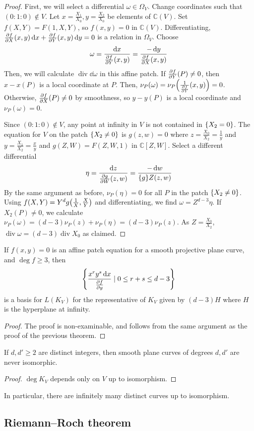\begin{proof}
    First, we will select a differential \( \omega \in \Omega_V \).
    Change coordinates such that \( (0 : 1 : 0) \not\in V \).
    Let \( x = \frac{X_1}{X_0}, y = \frac{X_2}{X_0} \) be elements of \( \mathbb C(V) \).
    Set \( f(X,Y) = F(1,X,Y) \), so \( f(x,y) = 0 \) in \( \mathbb C(V) \).
    Differentiating, \( \pdv{f}{X}\qty(x,y) \dd{x} + \pdv{f}{Y}\qty(x,y) \dd{y} = 0 \) is a relation in \( \Omega_V \).
    Choose
    \[ \omega = \frac{\dd{x}}{\pdv{f}{Y}\qty(x,y)} = \frac{-\dd{y}}{\pdv{f}{X}\qty(x,y)} \]
    Then, we will calculate \( \operatorname{div}\dd{\omega} \) in this affine patch.
    If \( \pdv{f}{Y}\qty(P) \neq 0 \), then \( x - x(P) \) is a local coordinate at \( P \).
    Then, \( \nu_P(\omega) = \nu_P\qty(\frac{1}{\pdv{f}{Y}}\qty(x,y)) = 0 \).
    Otherwise, \( \pdv{f}{X}\qty(P) \neq 0 \) by smoothness, so \( y - y(P) \) is a local coordinate and \( \nu_P(\omega) = 0 \).

    Since \( (0 : 1 : 0) \not\in V \), any point at infinity in \( V \) is not contained in \( \qty{X_2 = 0} \).
    The equation for \( V \) on the patch \( \qty{X_2 \neq 0} \) is \( g(z,w) = 0 \) where \( z = \frac{X_0}{X_2} = \frac{1}{y} \) and \( y = \frac{X_1}{X_2} = \frac{x}{y} \) and \( g(Z,W) = F(Z,W,1) \) in \( \mathbb C[Z,W] \).
    Select a different differential
    \[ \eta = \frac{\dd{z}}{\pdv{g}{W}\qty(z,w)} = \frac{-\dd{w}}{\qty{g}{Z}\qty(z,w)} \]
    By the same argument as before, \( \nu_P(\eta) = 0 \) for all \( P \) in the patch \( \qty{X_2 \neq 0} \).
    Using \( f(X,Y) = Y^d g\qty(\frac{1}{X}, \frac{X}{Y}) \) and differentiating, we find \( \omega = Z^{d-3} \eta \).
    If \( X_2(P) \neq 0 \), we calculate \( \nu_P(\omega) = (d-3)\nu_P(z) + \nu_P(\eta) = (d-3)\nu_P(z) \).
    As \( Z = \frac{X_0}{X_2} \), \( \operatorname{div} \omega = (d-3) \operatorname{div} X_0 \) as claimed.
\end{proof}
\begin{proposition}
    If \( f(x,y) = 0 \) is an affine patch equation for a smooth projective plane curve, and \( \deg f \geq 3 \), then
    \[ \qty{\frac{x^r y^s \dd{x}}{\pdv{f}{y}} \mid 0 \leq r + s \leq d - 3} \]
    is a basis for \( L(K_V) \) for the representative of \( K_V \) given by \( (d-3)H \) where \( H \) is the hyperplane at infinity.
\end{proposition}
\begin{proof}
    The proof is non-examinable, and follows from the same argument as the proof of the previous theorem.
\end{proof}
\begin{corollary}
    If \( d, d' \geq 2 \) are distinct integers, then smooth plane curves of degrees \( d, d' \) are never isomorphic.
\end{corollary}
\begin{proof}
    \( \deg K_V \) depends only on \( V \) up to isomorphism.
\end{proof}
In particular, there are infinitely many distinct curves up to isomorphism.

\subsection{Riemann--Roch theorem}
